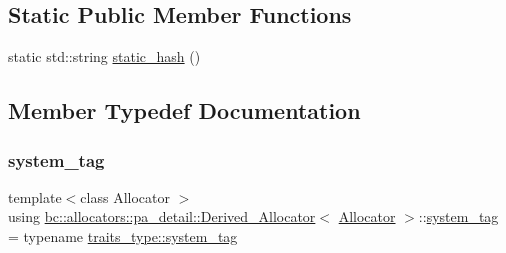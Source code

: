 \subsection*{Static Public Member Functions}
\begin{DoxyCompactItemize}
\item 
static std\+::string \hyperlink{structbc_1_1allocators_1_1pa__detail_1_1Derived__Allocator_ac8b23f4729cf661a1bb874d1ff3fb83e}{static\+\_\+hash} ()
\end{DoxyCompactItemize}


\subsection{Member Typedef Documentation}
\mbox{\label{structbc_1_1allocators_1_1pa__detail_1_1Derived__Allocator_a42f99505929fa39c067d186f5f623045}} 
\subsubsection{\texorpdfstring{system\+\_\+tag}{system\_tag}}
{\footnotesize\ttfamily template$<$class Allocator $>$ \\
using \hyperlink{structbc_1_1allocators_1_1pa__detail_1_1Derived__Allocator}{bc\+::allocators\+::pa\+\_\+detail\+::\+Derived\+\_\+\+Allocator}$<$ \hyperlink{classbc_1_1allocators_1_1Allocator}{Allocator} $>$\+::\hyperlink{structbc_1_1allocators_1_1pa__detail_1_1Derived__Allocator_a42f99505929fa39c067d186f5f623045}{system\+\_\+tag} =  typename \hyperlink{structbc_1_1allocators_1_1allocator__traits_a527cf77071c45a9dcc2c8213f65f37b3}{traits\+\_\+type\+::system\+\_\+tag}}

\mbox{\label{structbc_1_1allocators_1_1pa__detail_1_1Derived__Allocator_a99adbba950946cb42cb6f2ad3e18d9ca}} 
